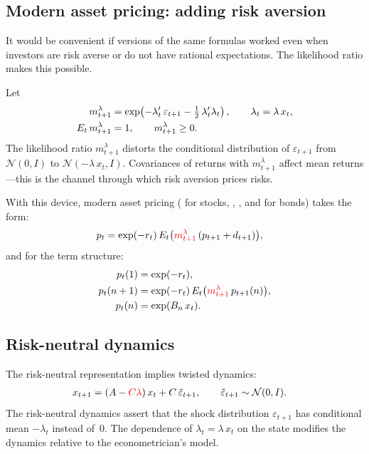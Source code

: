 \documentclass[12pt]{article}
\theoremstyle{definition}
\begin{document}
\subsection{Modern asset pricing: adding risk aversion}
\label{sec:modern-ap}

It would be convenient if versions of the same formulas worked even when
investors are risk averse or do not have rational expectations.  The
likelihood ratio makes this possible.

Let
\begin{align}
m_{t+1}^\lambda &= \exp\!\left(-\lambda_t'\, \varepsilon_{t+1}
    - \tfrac{1}{2}\,\lambda_t'\lambda_t\right), \qquad
    \lambda_t = \lambda\, x_t, \label{eq:sdf-lr}\\
E_t\, m_{t+1}^\lambda &= 1, \qquad m_{t+1}^\lambda \geq 0. \notag
\end{align}
The likelihood ratio $m_{t+1}^\lambda$ distorts the conditional
distribution of $\varepsilon_{t+1}$ from ${\mathcal N}(0,I)$ to
${\mathcal N}(-\lambda\, x_t, I)$.  Covariances of returns with
$m_{t+1}^\lambda$ affect mean returns---this is the channel through
which risk aversion prices risks.

With this device, modern asset pricing (\citet{Lucas1978} for stocks,
\citet{DS2000}, \citet{cox1985theory}, and  \citet{BZ1994} for bonds) takes the form:
\begin{align}
p_t &= \exp(-r_t)\, E_t\bigl(
    {\color{red} m_{t+1}^\lambda}\,(p_{t+1} + d_{t+1})\bigr),
    \label{eq:stock-lr}
\end{align}
and for the term structure:
\begin{align}
p_t(1) &= \exp(-r_t), \notag\\
p_t(n+1) &= \exp(-r_t)\, E_t\bigl(
    {\color{red} m_{t+1}^\lambda}\, p_{t+1}(n)\bigr), \label{eq:ts-lr}\\
p_t(n) &= \exp(B_n\, x_t). \notag
\end{align}

\subsection{Risk-neutral dynamics}

The risk-neutral representation implies twisted dynamics:
\begin{align*}
x_{t+1} &= (A - {\color{red} C\lambda})\, x_t
    + C\, \tilde\varepsilon_{t+1}, \qquad
    \tilde\varepsilon_{t+1} \sim {\mathcal N}(0,I).
\end{align*}
The risk-neutral dynamics assert that the shock distribution
$\varepsilon_{t+1}$ has conditional mean $-\lambda_t$ instead of~$0$.
The dependence of $\lambda_t = \lambda\, x_t$ on the state modifies
the dynamics relative to the econometrician's model.
\end{document}
